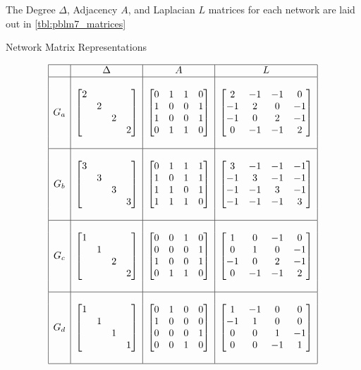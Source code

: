 \documentclass[]{article}
\numberwithin{equation}{section}
\begin{document}
The Degree $\Delta$, Adjacency $A$, and Laplacian $L$ matrices for each network are laid out in \tablename \ref{tbl:pblm7_matrices}
\begin{table}
	\caption{Network Matrix Representations}
	\[\begin{array}{|c|c|c|c|}
		\hline
			&\Delta &A &L\\
		\hline&&&\\
		G_a	
			&\mqty[\dmat{2,2,2,2}]	
			&\mqty[
				0	&1	&1	&0\\
				1	&0	&0	&1\\
				1	&0	&0	&1\\
				0	&1	&1	&0
			]
			&\mqty[
				2	&-1	&-1	&0\\
				-1	&2	&0	&-1\\
				-1	&0	&2	&-1\\
				0	&-1	&-1	&2
			]\\
		&&&\\\hline&&&\\
		G_b	
			&\mqty[\dmat{3,3,3,3}]	
			&\mqty[
				0	&1	&1	&1\\
				1	&0	&1	&1\\
				1	&1	&0	&1\\
				1	&1	&1	&0
			]
			&\mqty[
				3	&-1	&-1	&-1\\
				-1	&3	&-1	&-1\\
				-1	&-1	&3	&-1\\
				-1	&-1	&-1	&3
			]\\
		&&&\\\hline&&&\\
		G_c
			&\mqty[\dmat{1,1,2,2}]
			&\mqty[
				0	&0	&1	&0\\
				0	&0	&0	&1\\
				1	&0	&0	&1\\
				0	&1	&1	&0
			]
			&\mqty[
				1	&0	&-1	&0\\
				0	&1	&0	&-1\\
				-1	&0	&2	&-1\\
				0	&-1	&-1	&2
			]\\
		&&&\\\hline&&&\\	
		G_d
			&\mqty[\dmat{1,1,1,1}]
			&\mqty[
				0	&1	&0	&0\\
				1	&0	&0	&0\\
				0	&0	&0	&1\\
				0	&0	&1	&0
			]
			&\mqty[
				1	&-1	&0	&0\\
				-1	&1	&0	&0\\
				0	&0	&1	&-1\\
				0	&0	&-1	&1
			]\\
		&&&\\\hline
	\end{array}\]
	\label{tbl:pblm7_matrices}
\end{table}
\end{document}
